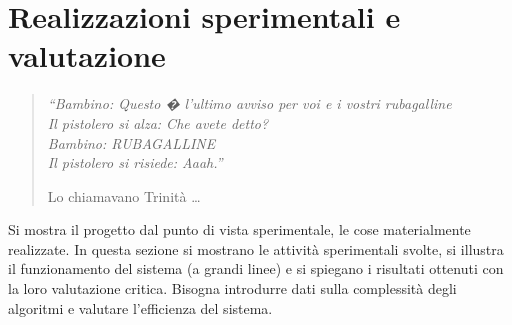 \chapter{Realizzazioni sperimentali e valutazione}
\label{capitolo6}
\thispagestyle{empty}

\begin{quotation}
{\footnotesize
\noindent\emph{``Bambino: Questo � l'ultimo avviso per voi e i vostri rubagalline \\
Il pistolero si alza: Che avete detto? \\
Bambino: RUBAGALLINE \\
Il pistolero si risiede: Aaah.''}
\begin{flushright}
Lo chiamavano Trinit\`a \dots
\end{flushright}
}
\end{quotation}
\vspace{0.5cm}

\noindent Si mostra il progetto dal punto di vista sperimentale, le cose materialmente realizzate. In questa sezione si mostrano le attivit\`a sperimentali svolte, si illustra il funzionamento del sistema (a grandi linee) e si spiegano i risultati ottenuti con la loro valutazione critica. Bisogna introdurre dati sulla complessit\`a degli algoritmi e valutare l'efficienza del sistema.